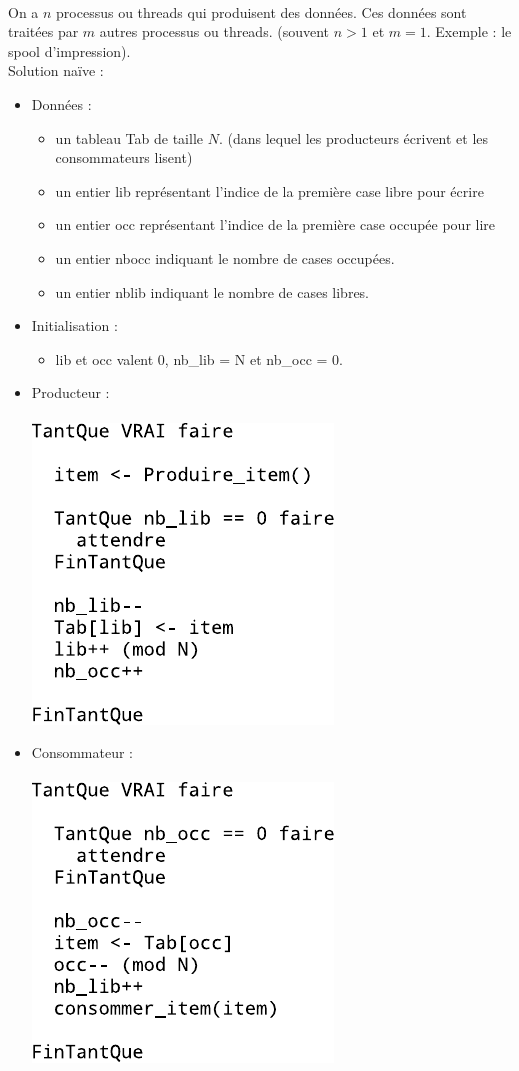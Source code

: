 \\
 On a $n$ processus ou threads qui produisent des données. Ces données sont traitées par $m$ autres processus ou threads. (souvent $n > 1$ et $m = 1$. Exemple : le spool d'impression). \\
Solution naïve :
\begin{itemize}
	\item Données : 
	\begin{itemize}
		\item un tableau Tab de taille $N$. (dans lequel les producteurs écrivent et les consommateurs lisent)
		\item un entier lib représentant l'indice de la première case libre pour écrire
		\item un entier occ représentant l'indice de la première case occupée pour lire
		\item un entier nbocc indiquant le nombre de cases occupées.
		\item un entier nblib indiquant le nombre de cases libres.
	\end{itemize}
	\item Initialisation :
	\begin{itemize}
		\item lib et occ valent 0, nb\_lib = N et nb\_occ = 0.
	\end{itemize}
	\item Producteur : \\
\\ 
\includegraphics{fig12.pdf}
	\item Consommateur : \\
\\ 
\includegraphics{fig13.pdf}
\end{itemize}

